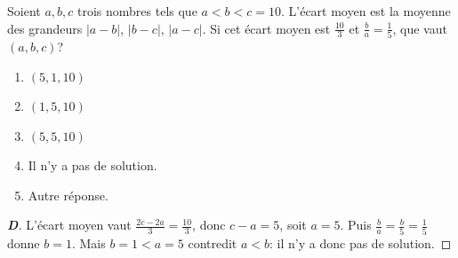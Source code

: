 % 
%
Soient $a, b, c$ trois nombres tels que $a < b < c = 10$. L'écart moyen est la
moyenne des grandeurs $|a-b|$, $|b-c|$, $|a-c|$. Si cet écart moyen est
$\frac{10}{3}$ et $\frac{b}{a} = \frac{1}{5}$, que vaut $(a,b,c)$?
\begin{enumerate}
  \item $(5,1,10)$
  \item $(1,5,10)$
  \item $(5,5,10)$
  \item Il n'y a pas de solution.
  \item Autre réponse.
\end{enumerate}
%
%
\begin{proof}[\textbf{D}]
L'écart moyen vaut $\frac{2c - 2a}{3} = \frac{10}{3}$, donc $c - a = 5$,
soit $a = 5$. Puis $\frac{b}{a} = \frac{b}{5} = \frac{1}{5}$ donne $b = 1$.
Mais $b = 1 < a = 5$ contredit $a < b$: il n'y a donc pas de solution.
\end{proof}
